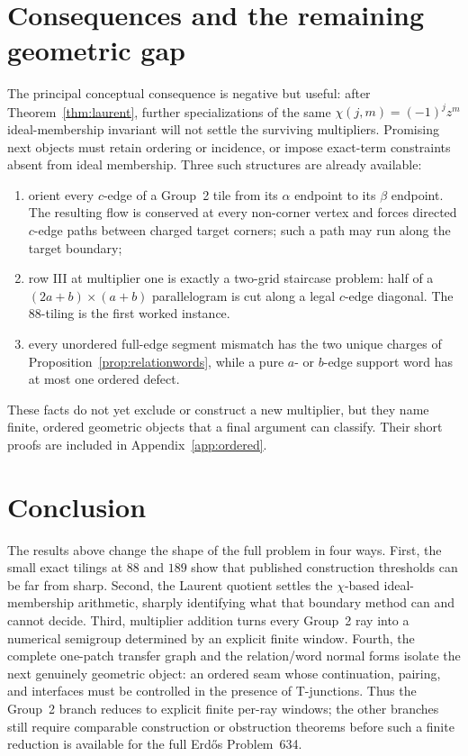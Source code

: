 \documentclass[11pt]{amsart}
\theoremstyle{definition}
\theoremstyle{remark}
\begin{document}
\section{Consequences and the remaining geometric gap}\label{sec:gap}

The principal conceptual consequence is negative but useful: after
Theorem~\ref{thm:laurent}, further specializations of the same
$\chi(j,m)=(-1)^jz^m$ ideal-membership invariant will not settle the surviving
multipliers.  Promising next objects must retain ordering or incidence, or
impose exact-term constraints absent from ideal membership.  Three such
structures are already available:
\begin{enumerate}[leftmargin=2.2em]
\item orient every $c$-edge of a Group~2 tile from its $\alpha$ endpoint to
      its $\beta$ endpoint.  The resulting flow is conserved at every
      non-corner vertex and forces directed $c$-edge paths between charged
      target corners; such a path may run along the target boundary;
\item row III at multiplier one is exactly a two-grid staircase problem:
      half of a $(2a+b)\times(a+b)$ parallelogram is cut along a legal
      $c$-edge diagonal.  The $88$-tiling is the first worked instance.
\item every unordered full-edge segment mismatch has the two unique charges
      of Proposition~\ref{prop:relationwords}, while a pure $a$- or $b$-edge
      support word has at most one ordered defect.
\end{enumerate}
These facts do not yet exclude or construct a new multiplier, but they name
finite, ordered geometric objects that a final argument can classify.
Their short proofs are included in Appendix~\ref{app:ordered}.

\section{Conclusion}

The results above change the shape of the full problem in four ways.
First, the small exact tilings at $88$ and $189$ show that published
construction thresholds can be far from sharp.  Second, the Laurent quotient
settles the $\chi$-based ideal-membership arithmetic, sharply identifying what
that boundary method can and cannot decide.  Third, multiplier addition
turns every Group~2 ray into a numerical semigroup determined by an explicit
finite window.  Fourth, the complete one-patch transfer graph and the
relation/word normal forms isolate the next genuinely geometric object: an
ordered seam whose continuation, pairing, and interfaces must be controlled
in the presence of T-junctions.  Thus the Group~2 branch reduces to explicit
finite per-ray windows; the other branches still require comparable
construction or obstruction theorems before such a finite reduction is
available for the full Erd\H{o}s Problem~634.
\end{document}
